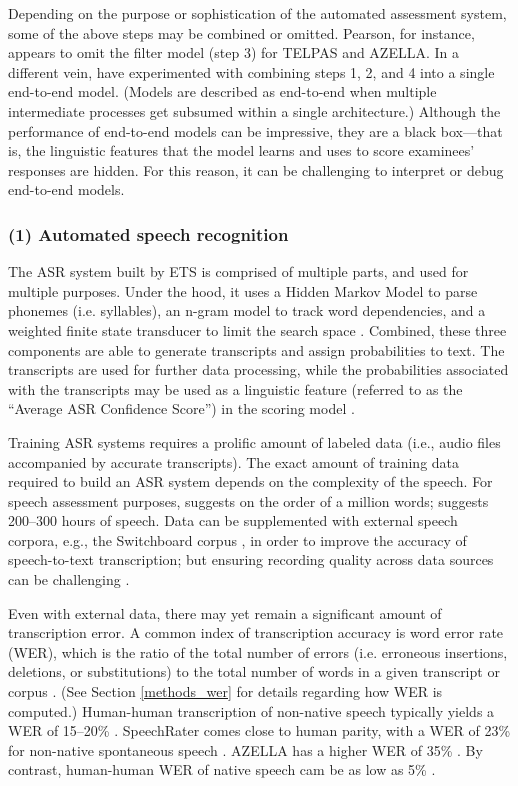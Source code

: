 \documentclass [PhD] {uclathes}
\begin{document}
Depending on the purpose or sophistication of the automated assessment system, some of the above steps may be combined or omitted. Pearson, for instance, appears to omit the filter model (step 3) for TELPAS and AZELLA. In a different vein, \citet{chen2018end} have experimented with combining steps 1, 2, and 4 into a single end-to-end model. (Models are described as end-to-end when multiple intermediate processes get subsumed within a single architecture.) Although the performance of end-to-end models can be impressive, they are a black box—that is, the linguistic features that the model learns and uses to score examinees’ responses are hidden. For this reason, it can be challenging to interpret or debug end-to-end models.

\subsubsection{(1) Automated speech recognition}

The ASR system built by ETS is comprised of multiple parts, and used for multiple purposes. Under the hood, it uses a Hidden Markov Model to parse phonemes (i.e. syllables), an n-gram model to track word dependencies, and a weighted finite state transducer to limit the search space \citep{qian2019automatic}. Combined, these three components are able to generate transcripts and assign probabilities to text. The transcripts are used for further data processing, while the probabilities associated with the transcripts may be used as a linguistic feature (referred to as the “Average ASR Confidence Score”) in the scoring model \citep{zhang2019assessing}.

Training ASR systems requires a prolific amount of labeled data (i.e., audio files accompanied by accurate transcripts). The exact amount of training data required to build an ASR system depends on the complexity of the speech. For speech assessment purposes, \citet{qian2019automatic} suggests on the order of a million words; \citet{evanini2017approaches} suggests 200–300 hours of speech. Data can be supplemented with external speech corpora, e.g., the Switchboard corpus \citep{godfrey1997switchboard}, in order to improve the accuracy of speech-to-text transcription; but ensuring recording quality across data sources can be challenging \citep{qian2019automatic}.

Even with external data, there may yet remain a significant amount of transcription error. A common index of transcription accuracy is word error rate (WER), which is the ratio of the total number of errors (i.e. erroneous insertions, deletions, or substitutions) to the total number of words in a given transcript or corpus \citep{qian2019automatic}. (See Section \ref{methods_wer} for details regarding how WER is computed.) Human-human transcription of non-native speech typically yields a WER of 15–20\% \citep{zechner2009}. SpeechRater comes close to human parity, with a WER of 23\% for non-native spontaneous speech \citep{tao2016exploring}. AZELLA has a higher WER of 35\% \citep{cheng2014automatic}. By contrast, human-human WER of native speech cam be as low as 5\% \citep{xiong2016achieving}.
\end{document}
